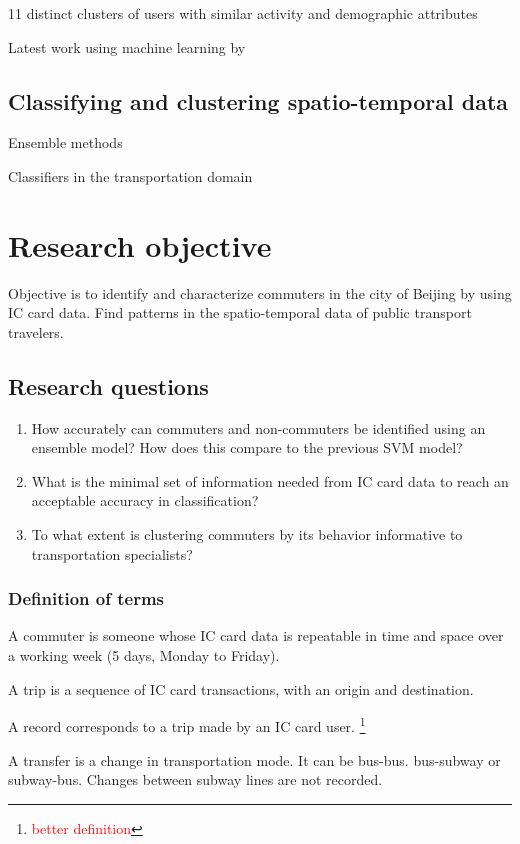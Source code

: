 \documentclass{article}
\newcommand{\selfnote}[1]{\footnote{\textcolor{red}{#1}}}
\begin{document}
11 distinct clusters of users with similar activity and demographic attributes \cite{langlois2016inferring}

Latest work using machine learning by \cite{ma2017understanding}

\subsection{Classifying and clustering spatio-temporal data}
Ensemble methods

Classifiers in the transportation domain


\newpage
\section{Research objective}
Objective is to identify and characterize commuters in the city of Beijing by using IC card data. Find patterns in the spatio-temporal data of public transport travelers. 

\subsection{Research questions}
\begin{enumerate}
\item How accurately can commuters and non-commuters be identified using an ensemble model? How does this compare to the previous SVM model?
\item What is the minimal set of information needed from IC card data to reach an acceptable accuracy in classification?
\item To what extent is clustering commuters by its behavior informative to transportation specialists? 
\end{enumerate}

\subsubsection{Definition of terms}
A commuter is someone whose IC card data is repeatable in time and space over a working week (5 days, Monday to Friday).

A trip is a sequence of IC card transactions, with an origin and destination.

A record corresponds to a trip made by an IC card user. \selfnote{better definition}

A transfer is a change in transportation mode. It can be bus-bus. bus-subway or subway-bus. Changes between subway lines are not recorded. 
\end{document}
